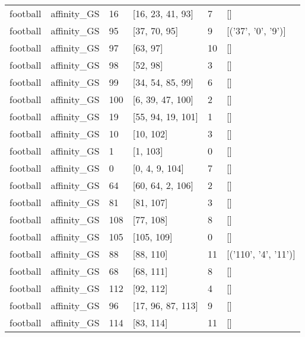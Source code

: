 \begin{tabular}{llllll}
football & affinity_GS & 16 & [16, 23, 41, 93] & 7 & [] \\
football & affinity_GS & 95 & [37, 70, 95] & 9 & [('37', '0', '9')] \\
football & affinity_GS & 97 & [63, 97] & 10 & [] \\
football & affinity_GS & 98 & [52, 98] & 3 & [] \\
football & affinity_GS & 99 & [34, 54, 85, 99] & 6 & [] \\
football & affinity_GS & 100 & [6, 39, 47, 100] & 2 & [] \\
football & affinity_GS & 19 & [55, 94, 19, 101] & 1 & [] \\
football & affinity_GS & 10 & [10, 102] & 3 & [] \\
football & affinity_GS & 1 & [1, 103] & 0 & [] \\
football & affinity_GS & 0 & [0, 4, 9, 104] & 7 & [] \\
football & affinity_GS & 64 & [60, 64, 2, 106] & 2 & [] \\
football & affinity_GS & 81 & [81, 107] & 3 & [] \\
football & affinity_GS & 108 & [77, 108] & 8 & [] \\
football & affinity_GS & 105 & [105, 109] & 0 & [] \\
football & affinity_GS & 88 & [88, 110] & 11 & [('110', '4', '11')] \\
football & affinity_GS & 68 & [68, 111] & 8 & [] \\
football & affinity_GS & 112 & [92, 112] & 4 & [] \\
football & affinity_GS & 96 & [17, 96, 87, 113] & 9 & [] \\
football & affinity_GS & 114 & [83, 114] & 11 & [] \\
\bottomrule
\end{tabular}


